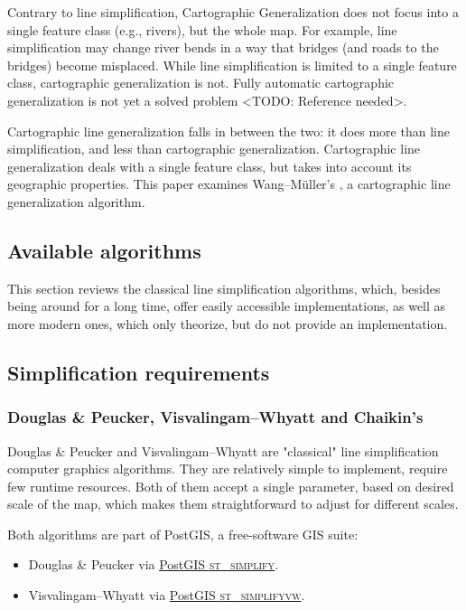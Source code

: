 \documentclass[a4paper]{article}
\newcommand{\titlecite}[1]{\citetitle{#1}\cite{#1}}
\newcommand{\DP}{Douglas \& Peucker}
\newcommand{\VW}{Visvalingam--Whyatt}
\newcommand{\WM}{Wang--M{\"u}ller}
\begin{document}
Contrary to line simplification, Cartographic Generalization does not focus
into a single feature class (e.g., rivers), but the whole map. For example,
line simplification may change river bends in a way that bridges (and roads to
the bridges) become misplaced. While line simplification is limited to a single
feature class, cartographic generalization is not. Fully automatic cartographic
generalization is not yet a solved problem <TODO: Reference needed>.

Cartographic line generalization falls in between the two: it does more than
line simplification, and less than cartographic generalization. Cartographic
line generalization deals with a single feature class, but takes into account
its geographic properties. This paper examines {\WM}'s
\titlecite{wang1998line}, a cartographic line generalization algorithm.

\subsection{Available algorithms}

This section reviews the classical line simplification algorithms, which,
besides being around for a long time, offer easily accessible implementations,
as well as more modern ones, which only theorize, but do not provide an
implementation.

\subsection{Simplification requirements}

\subsubsection{{\DP}, {\VW} and Chaikin's}
\label{sec:dp-vw-chaikin}

{\DP}\cite{douglas1973algorithms} and {\VW}\cite{visvalingam1993line} are
"classical" line simplification computer graphics algorithms. They are
relatively simple to implement, require few runtime resources. Both of them
accept a single parameter, based on desired scale of the map, which makes them
straightforward to adjust for different scales.

Both algorithms are part of PostGIS, a free-software GIS suite:
\begin{itemize}
    \item {\DP} via
        \href{https://postgis.net/docs/ST_Simplify.html}{PostGIS \textsc{st\_simplify}}.

    \item {\VW} via
        \href{https://postgis.net/docs/ST_SimplifyVW.html}{PostGIS
        \textsc{st\_simplifyvw}}.
\end{itemize}
\end{document}
